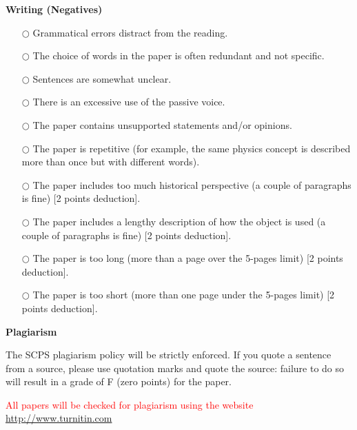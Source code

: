 \documentclass[12pt]{article}   %
\begin{document}
{\textbf{Writing (Negatives)}}
\begin{itemize}
\item[$\bigcirc$] Grammatical errors distract from the reading.
\item[$\bigcirc$] The choice of words in the paper is often redundant and not specific. 
\item[$\bigcirc$] Sentences are somewhat unclear.
\item[$\bigcirc$] There is an excessive use of the passive voice.
\item[$\bigcirc$] The paper contains unsupported statements and/or opinions.
\item[$\bigcirc$] The paper is repetitive (for example, the same physics concept is described more than once but with different words).
\item[$\bigcirc$] The paper includes too much historical perspective (a couple of paragraphs is fine) [2 points deduction].
\item[$\bigcirc$] The paper includes a lengthy description of how the object is used (a couple of paragraphs is fine) [2 points deduction].
\item[$\bigcirc$] The paper is too long (more than a page over the 5-pages limit) [2 points deduction].
\item[$\bigcirc$] The paper is too short (more than one page under the 5-pages limit) [2 points deduction].
\end{itemize}

{\textbf{Plagiarism}}

The SCPS plagiarism policy will be strictly enforced. If you quote a sentence from a source, please use quotation marks and quote the source: failure to do so will result in a grade of F (zero points) for the paper. 

{\textcolor{red}{All papers will be checked for plagiarism using the website \url{http://www.turnitin.com}}}


\end{document}
